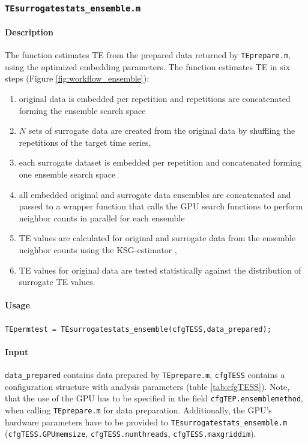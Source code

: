 \documentclass[a4paper,10pt]{article}
\begin{document}
\subsubsection{\texttt{TEsurrogatestats\_ensemble.m}}

\paragraph*{Description} The function estimates TE from the prepared data returned by \verb&TEprepare.m&, using the optimized embedding parameters. The function estimates TE in six steps (Figure \ref{fig:workflow_ensemble}): 
\begin{enumerate}
  \item original data is embedded per repetition and repetitions are
concatenated forming the ensemble search space
  \item $N$ sets of surrogate data are created from the original
data by shuffling the repetitions of the target time series, 
  \item each surrogate dataset is embedded per repetition and concatenated forming one ensemble search space 
  \item all embedded original and surrogate data ensembles are concatenated and passed to a wrapper function that calls the GPU search functions to perform neighbor counts in parallel for each ensemble 
  \item TE values are calculated for original and surrogate data from the ensemble neighbor counts using the KSG-estimator \cite{kraskov2004}, 
  \item TE values for original data are tested statistically against the distribution of surrogate TE values.
\end{enumerate}

\paragraph*{Usage} \verb&TEpermtest = TEsurrogatestats_ensemble(cfgTESS,data_prepared);& 

\paragraph*{Input} \texttt{data\_prepared} contains data prepared by \verb&TEprepare.m&, \verb&cfgTESS& contains a configuration structure with analysis parameters (table \ref{tab:cfgTESS}). Note, that the use of the GPU has to be specified in the field \texttt{cfgTEP.ensemblemethod}, when calling \texttt{TEprepare.m} for data preparation. Additionally, the GPU's hardware parameters have to be provided to \texttt{TEsurrogatestats\_ensemble.m} (\verb+cfgTESS.GPUmemsize+, \verb+cfgTESS.numthreads+, \verb+cfgTESS.maxgriddim+). 
\end{document}
